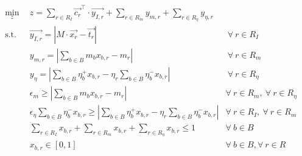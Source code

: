 \begin{subequations}\label{eqs:roap}
  \begin{align}
    \min_{z} \:\: & 
    z = \sum_{r \in R_I} \vec{c_{r}}^{\top} \cdot \vec{y_{I,r}}
    + \sum_{r \in R_m} y_{m,r} + \sum_{r \in R_\eta} y_{\eta,r}
    & \label{eqs:roap_obj} \\
    \text{s.t.} \:\: &
    \vec{y_{I,r}} = \left| M \cdot \vec{x_{r}}  - \vec{t_{r}} \right|
    &
    \: \forall \: r \in R_I \label{eqs:roap_iso_y} \\
    &
    y_{m,r} = \left| \sum_{b \in B} m_{b} x_{b,r} - m_{r} \right| 
    &
    \: \forall \: r \in R_m \label{eqs:roap_mass_y} \\
    &
    y_{\eta} = \left| \sum_{b \in B} \eta_{b}^{+} x_{b,r}
    - \eta_{r} \sum_{b \in B} \eta_{b}^{-} x_{b,r} \right|
    &
    \: \forall \: r \in R_\eta \label{eqs:roap_eta_y} \\
    &
    \epsilon_{m} \geq \left| \sum_{b \in B} m_{b} x_{b,r} - m_{r} \right|
    & 
    \forall \: r \in R_m, \: \forall \: r \in R_{\eta} \label{eqs:roap_mass} \\
    &
    \epsilon_{\eta} \sum_{b \in B} \eta_{b}^{-} x_{b,r} \geq 
    \left| \sum_{b \in B} \eta_{b}^{+} x_{b,r} - 
           \eta_{r} \sum_{b \in B} \eta_{b}^{-} x_{b,r} \right|
    & 
    \forall \: r \in R_{I}, \: \forall \: r \in R_{m} \label{eqs:roap_eta} \\
    &
    \sum_{r \in R_{I}} x_{b,r} +
    \sum_{r \in R_{m}} x_{b,r} + 
    \sum_{r \in R_{\eta}} x_{b,r} \leq 1
    & 
    \forall \: b \in B \label{eqs:roap_conserv} \\
    &
    x_{b,r} \in \left[ 0, 1 \right]
    & 
    \forall \: b \in B, 
    \forall \: r \in R  \label{eqs:roap_x}
  \end{align}
\end{subequations}


